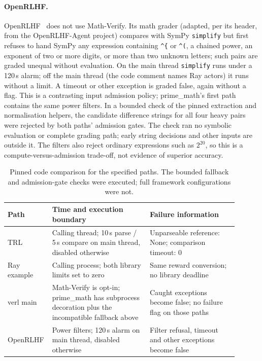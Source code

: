\documentclass[10pt,a4paper]{article}
\newcommand{\mv}{Math-Verify}
\begin{document}
\paragraph{OpenRLHF.} OpenRLHF~\citep{openrlhf} does not use \mv{}. Its math
grader (adapted, per its header, from the OpenRLHF-Agent project) compares
with SymPy \texttt{simplify}
but first refuses to hand SymPy any expression containing \verb|^{| or
\verb|^(|, a chained power, an exponent of two or more digits, or more than two
unknown letters; such pairs are graded unequal without evaluation. On the main
thread \texttt{simplify} runs under a 120\,s alarm; off the main thread (the
code comment names Ray actors) it runs without a limit. A timeout or other
exception is graded false, again without a flag. This is a contrasting input
admission policy; prime\_math's first path contains the same power filters.
In a bounded check of the pinned extraction and normalisation helpers, the
candidate difference strings for all four heavy pairs were rejected by both
paths' admission gates. The check ran no symbolic evaluation or complete
grading path; early string decisions and other inputs are outside it. The
filters also reject ordinary expressions such as $2^{20}$, so this is a
compute-versus-admission trade-off, not evidence of superior accuracy.

\begin{table}[t]
\centering\small
\begin{tabular}{p{0.12\linewidth}p{0.41\linewidth}p{0.37\linewidth}}
\toprule
Path & Time and execution boundary & Failure information \\
\midrule
TRL & Calling thread; 10\,s parse / 5\,s compare on main thread, disabled otherwise & Unparseable reference: None; comparison timeout: $0$ \\
Ray example & Calling process; both library limits set to zero & Same reward conversion; no library deadline \\
verl main & Math-Verify is opt-in; prime\_math has subprocess decoration plus the incompatible fallback above & Caught exceptions become false; no failure flag on those paths \\
OpenRLHF & Power filters; 120\,s alarm on main thread, disabled otherwise & Filter refusal, timeout and other exceptions become false \\
\bottomrule
\end{tabular}
\caption{Pinned code comparison for the specified paths. The bounded
fallback and admission-gate checks were executed; full framework configurations
were not.}
\label{tab:frameworks}
\end{table}
\end{document}
